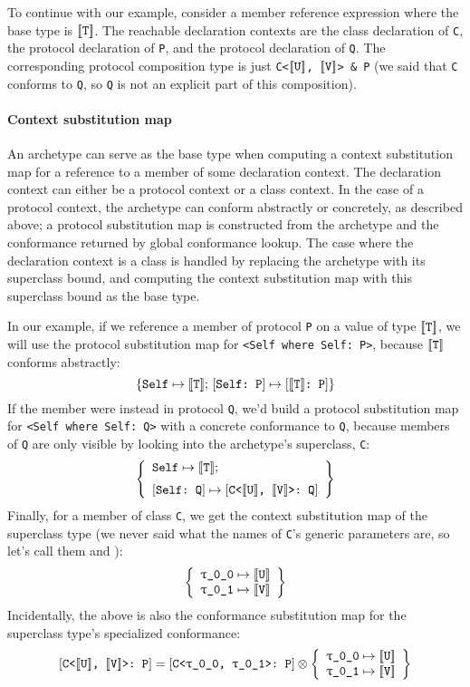 \documentclass[../generics]{subfiles}
\begin{document}
To continue with our example, consider a member reference expression where the base type is $[\![\texttt{T}]\!]$. The reachable declaration contexts are the class declaration of \texttt{C}, the protocol declaration of \texttt{P}, and the protocol declaration of \texttt{Q}.
The corresponding protocol composition type is just \texttt{C<$[\![\texttt{U}]\!]$, $[\![\texttt{V}]\!]$> \& P} (we said that \texttt{C} conforms to \texttt{Q}, so \texttt{Q} is not an explicit part of this composition).

\paragraph{Context substitution map} An archetype can serve as the base type when computing a context substitution map for a reference to a member of some declaration context. The declaration context can either be a protocol context or a class context. In the case of a protocol context, the archetype can conform abstractly or concretely, as described above; a protocol substitution map is constructed from the archetype and the conformance returned by global conformance lookup. The case where the declaration context is a class is handled by replacing the archetype with its superclass bound, and computing the context substitution map with this superclass bound as the base type.

In our example, if we reference a member of protocol \texttt{P} on a value of type $[\![\texttt{T}]\!]$, we will use the protocol substitution map for \verb|<Self where Self: P>|, because $[\![\texttt{T}]\!]$ conforms abstractly:
\[
\{\texttt{Self} \mapsto \texttt{$[\![\texttt{T}]\!]$};\,[\texttt{Self:~P}] \mapsto [\texttt{$[\![\texttt{T}]\!]$:~P}]\}
\]
If the member were instead in protocol \texttt{Q}, we'd build a protocol substitution map for \verb|<Self where Self: Q>| with a concrete conformance to \texttt{Q}, because members of \texttt{Q} are only visible by looking into the archetype's superclass, \texttt{C}:
\[
\SubstMapLongC{\SubstType{Self}{$\archetype{T}$}}{\SubstConf{Self}{C<$\archetype{U}$, $\archetype{V}$>}{Q}}
\]
Finally, for a member of class \texttt{C}, we get the context substitution map of the superclass type (we never said what the names of \texttt{C}'s generic parameters are, so let's call them  and ):
\[
\left\{\begin{array}{l}\texttt{\texttt{$\uptau$\_0\_0}} \mapsto \texttt{$[\![\texttt{U}]\!]$}\\\texttt{\texttt{$\uptau$\_0\_1}} \mapsto \texttt{$[\![\texttt{V}]\!]$}\end{array}\right\}
\]
Incidentally, the above is also the conformance substitution map for the superclass type's specialized conformance:
\[
\ConfReq{C<$\archetype{U}$, $\archetype{V}$>}{P} = \ConfReq{C<\ttgp{0}{0}, \ttgp{0}{1}>}{P} \otimes \SubstMapLong{\SubstType{\ttgp{0}{0}}{$\archetype{U}$}\\\SubstType{\ttgp{0}{1}}{$\archetype{V}$}}
\]
\end{document}
